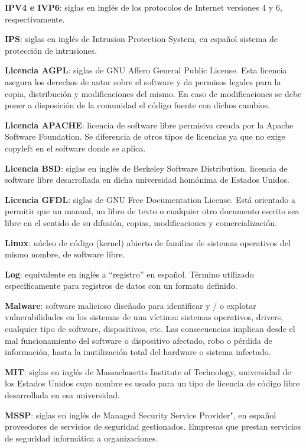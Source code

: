 \textbf{IPV4 e IVP6}: siglas en inglés de los protocolos de Internet versiones 4 y 6, respectivamente. \par

\textbf{IPS}: siglas en inglés de Intrusion Protection System, en español sistema de protección de intrusiones. \par

\textbf{Licencia AGPL}: siglas de GNU Affero General Public License. Esta licencia asegura los derechos de autor sobre el software y da permisos legales para la copia, distribución y modificaciones del mismo. En caso de modificaciones se debe poner a disposición de la comunidad el código fuente con dichos cambios. \par

\textbf{Licencia APACHE}: licencia de software libre permisiva creada por la Apache Software Foundation. Se diferencia de otros tipos de licencias ya que no exige copyleft en el software donde se aplica. \par

\textbf{Licencia BSD}: siglas en inglés de Berkeley Software Distribution, licencia de software libre desarrollada en dicha universidad homónima de Estados Unidos. \par

\textbf{Licencia GFDL}: siglas de GNU Free Documentation License. Está orientado a permitir que un manual, un libro de texto o cualquier  otro documento escrito sea libre en el sentido de su difusión, copias, modificaciones y comercialización. \par

\textbf{Linux}: núcleo de código (kernel) abierto de familias de sistemas operativos del mismo nombre, de software libre. \par

\textbf{Log}: equivalente en inglés a “registro” en español. Término utilizado específicamente para registros de datos con un formato definido. \par

\textbf{Malware}: software malicioso diseñado para identificar y / o explotar vulnerabilidades en  los sistemas de  una víctima: sistemas operativos, drivers, cualquier tipo de software, dispositivos, etc. Las consecuencias implican desde el mal funcionamiento del software o dispositivo afectado, robo o pérdida de información, hasta la inutilización total del hardware o sistema infectado. \par

\textbf{MIT}: siglas en inglés de Massachusetts Institute of Technology, universidad de los Estados Unidos cuyo nombre es usado para un tipo de licencia de código libre desarrollada en esa universidad. \par
\textbf{MSSP}: siglas 
en inglés de Managed Security Service Provider", en español proveedores de servicios de seguridad gestionados. Empresas que prestan servicios de seguridad informática a organizaciones. \par

